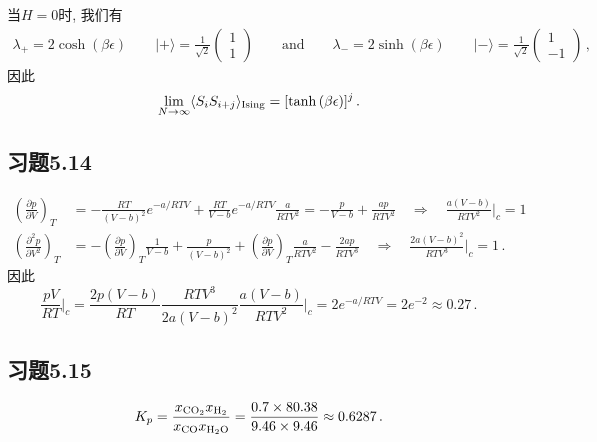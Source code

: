 \documentclass[letterpaper, 10pt]{article}
\begin{document}
当$H=0$时, 我们有
\begin{align*}
\lambda_{+} = 2 \cosh{(\beta\epsilon)} \qquad{} \lvert{+}\rangle = \frac{1}{\sqrt{2}} \begin{pmatrix} 1 \\ 1 \end{pmatrix} \qquad{} \text{and} \qquad{} \lambda_{-} = 2 \sinh{(\beta\epsilon)} \qquad{} \lvert{-}\rangle = \frac{1}{\sqrt{2}} \begin{pmatrix} 1 \\ -1 \end{pmatrix}\,,
\end{align*}
因此
\begin{align*}
\lim_{N\rightarrow\infty} \langle{S_{i}S_{i+j}}\rangle_{{\rm Ising}} = [\tanh{(\beta\epsilon)}]^{j}\,.
\end{align*}

\subsection{习题5.14}
\begin{align*}
\left( \frac{\partial{p}}{\partial{V}} \right)_{T} & = -\frac{RT}{(V-b)^{2}} e^{-a/RTV} + \frac{RT}{V-b} e^{-a/RTV} \frac{a}{RTV^{2}} = -\frac{p}{V-b} + \frac{ap}{RTV^{2}} \quad{} \Rightarrow \quad{} \frac{a(V-b)}{RTV^{2}}\bigg\rvert_{c} = 1 \nonumber \\
\left( \frac{\partial^{2}{p}}{\partial{V}^{2}} \right)_{T} & = -\left( \frac{\partial{p}}{\partial{V}} \right)_{T} \frac{1}{V-b} + \frac{p}{(V-b)^{2}} + \left( \frac{\partial{p}}{\partial{V}} \right)_{T} \frac{a}{RTV^{2}} - \frac{2ap}{RTV^{3}} \quad{} \Rightarrow \quad{} \frac{2a(V-b)^{2}}{RTV^{3}}\bigg\rvert_{c} = 1\,.
\end{align*}
因此
\[ \frac{pV}{RT}\bigg\rvert_{c} = \frac{2p(V-b)}{RT} \frac{RTV^{3}}{2a(V-b)^2} \frac{a(V-b)}{RTV^{2}} \bigg\rvert_{c} = 2 e^{-a/RTV} = 2 e^{-2} \approx 0.27\,. \]

\subsection{习题5.15}
\[ K_{p} = \frac{x_{\rm CO_{2}}x_{\rm H_{2}}}{x_{\rm CO}x_{\rm H_{2}O}} = \frac{0.7\times80.38}{9.46\times9.46} \approx 0.6287\,. \]
\end{document}
